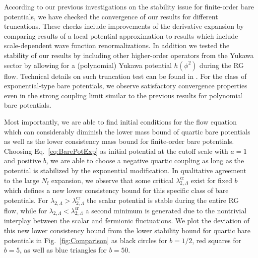 \documentclass[twocolumn,aps,prd,showpacs,nofootinbib,superscriptaddress,preprintnumbers,floatfix,10pt]{revtex4-1}
\newcommand{\Nf}{N_{\mathrm{f}}}
\begin{document}
According to our previous investigations on the stability issue for finite-order bare potentials, we have checked the convergence of our results for different truncations. These checks include improvements of the derivative expansion by comparing results of a local potential approximation to results which include scale-dependent wave function renormalizations. In addition we tested the stability of our results by including other higher-order operators from the Yukawa sector by allowing for a (polynomial) Yukawa potential $h(\phi^{2})$ during the RG flow. Technical details on such truncation test can be found in \cite{Gies:2013fua,Gies:2014xha,Borchardt:2016xju,Gies:2017zwf}.
For the class of exponential-type bare potentials, we observe satisfactory convergence properties even in the strong coupling limit similar to the previous results for polynomial bare potentials. 

Most importantly, we are able to find initial conditions for the flow equation which can considerably diminish the lower mass bound of quartic bare potentials as well as the lower consistency mass bound for finite-order bare potentials. Choosing Eq.~\eqref{eq:BarePotExp} as initial potential at the cutoff scale with $a=1$ and positive $b$, we are able to choose a negative quartic coupling as long as the potential is stabilized by the exponential modification. In qualitative agreement to the large $\Nf$ expansion, we observe that some critical $\lambda_{2,\Lambda}^{\mathrm{cr}}$ exist for fixed $b$ which defines a new lower consistency bound for this specific class of bare potentials. For $\lambda_{2,\Lambda} > \lambda_{2,\Lambda}^{\mathrm{cr}}$ the scalar potential is stable during the entire RG flow, while for $\lambda_{2,\Lambda} < \lambda_{2,\Lambda}^{\mathrm{cr}}$ a second minimum is generated due to the nontrivial interplay between the scalar and fermionic fluctuations. We plot the deviation of this new lower consistency bound from the lower stability bound for quartic bare potentials in Fig.~\ref{fig:Comparison} as black circles for $b=1/2$, red squares for $b=5$, as well as blue triangles for $b=50$. 
\end{document}
